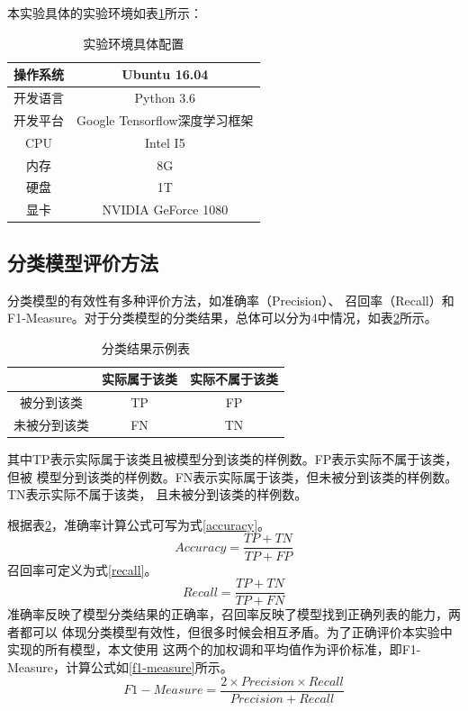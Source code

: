 本实验具体的实验环境如表\ref{train_env_table}所示：
\begin{table}[h]
    \caption{实验环境具体配置}
    \begin{tabular}{|c|c|}
        \hline
        操作系统 & Ubuntu 16.04 \\
        \hline
        开发语言 & Python 3.6 \\
        \hline
        开发平台 & Google Tensorflow深度学习框架 \\
        \hline
        CPU & Intel I5 \\
        \hline
        内存 & 8G \\
        \hline
        硬盘 & 1T \\
        \hline
        显卡 & NVIDIA GeForce 1080 \\
        \hline
    \end{tabular}
    \label{train_env_table}
\end{table}
\subsection{分类模型评价方法}
\label{test_fun}
分类模型的有效性有多种评价方法，如准确率（Precision）、
召回率（Recall）和F1-Measure。对于分类模型的分类结果，总体可以分为4中情况，如表\ref{classification_demo_table}所示。
\begin{table}[h]
    \caption{分类结果示例表}
    \begin{tabular}{|c|c|c|}
        \hline
        & 实际属于该类 & 实际不属于该类 \\
        \hline
        被分到该类 & TP & FP \\
        \hline
        未被分到该类 & FN & TN \\
        \hline
    \end{tabular}
    \label{classification_demo_table}
\end{table}
其中TP表示实际属于该类且被模型分到该类的样例数。FP表示实际不属于该类，但被
模型分到该类的样例数。FN表示实际属于该类，但未被分到该类的样例数。TN表示实际不属于该类，
且未被分到该类的样例数。

根据表\ref{classification_demo_table}，准确率计算公式可写为式\ref{accuracy}。
\begin{equation}
    Accuracy=\frac{TP+TN}{TP+FP}
    \label{accuracy}
\end{equation}
召回率可定义为式\ref{recall}。
\begin{equation}
    Recall=\frac{TP+TN}{TP+FN}
    \label{recall}
\end{equation}
准确率反映了模型分类结果的正确率，召回率反映了模型找到正确列表的能力，两者都可以
体现分类模型有效性，但很多时候会相互矛盾。为了正确评价本实验中实现的所有模型，本文使用
这两个的加权调和平均值作为评价标准，即F1-Measure，计算公式如\ref{f1-measure}所示。
\begin{equation}
    F1-Measure=\frac{2\times Precision \times Recall}{Precision+Recall}
    \label{f1-measure}
\end{equation}
